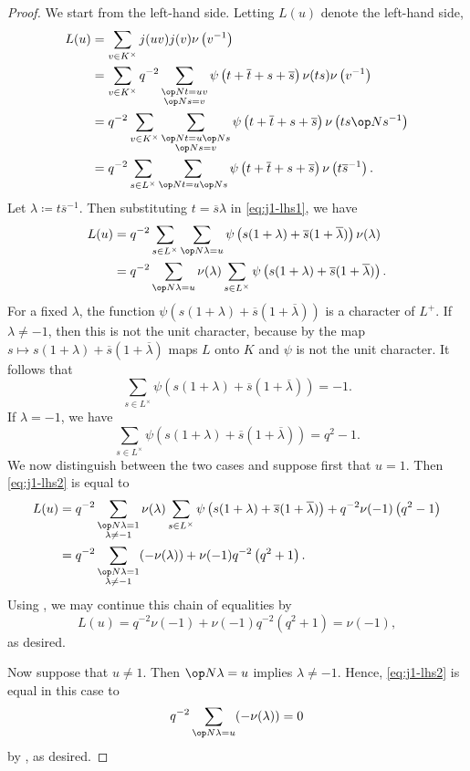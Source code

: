 \documentclass[../main.tex]{subfiles}
\begin{document}
\begin{proof}
	We start from the left-hand side. Letting $L(u)$ denote the left-hand side,
	\begin{align}
		L(u) &= \sum_{v\in K^\times}j(uv)j(v)\nu\left(v^{-1}\right) \notag \\
		&= \sum_{v\in K^\times}q^{-2}\sum_{\substack{\op Nt=uv\\\op Ns=v}}\psi\left(t+\overline t+s+\overline s\right)\nu(ts)\nu\left(v^{-1}\right) \notag \\
		&= q^{-2}\sum_{v\in K^\times}\sum_{\substack{\op Nt=u\op Ns\\\op Ns=v}}\psi\left(t+\overline t+s+\overline s\right)\nu\left(ts\op Ns^{-1}\right) \notag \\
		&= q^{-2}\sum_{s\in L^\times}\sum_{\op Nt=u\op Ns}\psi\left(t+\overline t+s+\overline s\right)\nu\left(t\overline s^{-1}\right). \label{eq:j1-lhs1}
	\end{align}
	Let $\lambda\coloneqq t\overline s^{-1}$. Then substituting $t=\overline s\lambda$ in \eqref{eq:j1-lhs1}, we have
	\begin{align}
		L(u) &= q^{-2}\sum_{s\in L^\times}\sum_{\op N\lambda=u}\psi\left(s(1+\lambda)+\overline s(1+\overline\lambda)\right)\nu(\lambda) \notag \\
		&= q^{-2}\sum_{\op N\lambda=u}\nu(\lambda)\sum_{s\in L^\times}\psi\left(s(1+\lambda)+\overline s(1+\overline\lambda)\right). \label{eq:j1-lhs2}
	\end{align}
	For a fixed $\lambda$, the function $\psi\left(s(1+\lambda)+\overline s(1+\overline\lambda)\right)$ is a character of $L^+$. If $\lambda\ne-1$, then this is not the unit character, because by  the map $s\mapsto s(1+\lambda)+\overline s(1+\overline\lambda)$ maps $L$ onto $K$ and $\psi$ is not the unit character. It follows that
	\[\sum_{s\in L^\times}\psi\left(s(1+\lambda)+\overline s(1+\overline\lambda)\right)=-1.\]
	If $\lambda=-1$, we have
	\[\sum_{s\in L^\times}\psi\left(s(1+\lambda)+\overline s(1+\overline\lambda)\right)=q^2-1.\]
	We now distinguish between the two cases and suppose first that $u=1$. Then \eqref{eq:j1-lhs2} is equal to
	\begin{align}
		L(u) &= q^{-2}\sum_{\substack{\op N\lambda=1\\\lambda\ne-1}}\nu(\lambda)\sum_{s\in L^\times}\psi\left(s(1+\lambda)+\overline s(1+\overline\lambda)\right)+q^{-2}\nu(-1)\left(q^2-1\right) \\
		&= q^{-2}\sum_{\substack{\op N\lambda=1\\\lambda\ne-1}}(-\nu(\lambda))+\nu(-1)q^{-2}\left(q^2+1\right).
	\end{align}
	Using , we may continue this chain of equalities by
	\[L(u)=q^{-2}\nu(-1)+\nu(-1)q^{-2}\left(q^2+1\right)=\nu(-1),\]
	as desired.

	Now suppose that $u\ne1$. Then $\op N\lambda=u$ implies $\lambda\ne-1$. Hence, \eqref{eq:j1-lhs2} is equal in this case to
	\[q^{-2}\sum_{\op N\lambda=u}(-\nu(\lambda))=0\]
	by , as desired.
\end{proof}
\end{document}
